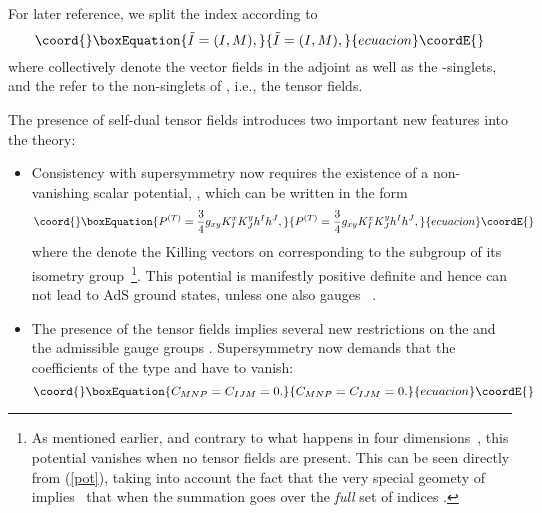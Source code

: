 \documentclass[a4paper,11pt]{article}
\providecommand{\ti}{\ensuremath{\tilde{I}}}
\providecommand{\tj}{\ensuremath{\tilde{J}}}
\providecommand{\tk}{\ensuremath{\tilde{K}}}
\providecommand{\M}{\ensuremath{\mathcal{M}}}
\begin{document}
For later reference, we split the index \myHighlight{$\ti$}\coordHE{} according to
\begin{equation}\coord{}\boxEquation{
\ti=(I,M),
}{
\ti=(I,M),
}{ecuacion}\coordE{}\end{equation}
where \coordHE{} collectively denote the
vector fields in the adjoint as well as the \coordHE{}-singlets, and the
\coordHE{} refer to the non-singlets of \coordHE{},
i.e., the tensor fields.

The presence of self-dual tensor fields introduces two important
new features into the theory:
\begin{itemize}

\item Consistency with supersymmetry now requires the existence
of a non-vanishing
scalar potential, \coordHE{}, which can be written in the form~\cite{GZ1}
\begin{equation}\coord{}\boxEquation{\label{pot}
P^{(T)}=\frac{3}{4}g_{xy}K^{x}_I K^{y}_J h^I h^J,
}{P^{(T)}=\frac{3}{4}g_{xy}K^{x}_I K^{y}_J h^I h^J,
}{ecuacion}\coordE{}\end{equation}
where the \coordHE{} denote the Killing vectors on \myHighlight{$\M_{VS}$}\coordHE{} corresponding to the subgroup 
\myHighlight{$K\subset G_{VS}\subset Iso(\M_{VS})$}\coordHE{} of its isometry group~\footnote{As mentioned 
earlier, and contrary to what happens in four dimensions~\cite{dWvP0,ABCDFF}, this 
potential vanishes when no tensor fields are present. This can be seen directly from 
(\ref{pot}), taking into account the fact that the very special geomety of \myHighlight{$\M_{VS}$}\coordHE{} 
implies~\cite{GST2} that \myHighlight{$ K^{x}_{\ti}  h^{\ti}=0$}\coordHE{} when the summation goes over the 
\emph{full} set of indices \myHighlight{$\ti$}\coordHE{}.}. This potential is manifestly positive definite and 
hence  can not lead to AdS ground states, unless one also gauges \coordHE{}~\cite{GZ2}.

\item The presence of the tensor fields
implies  several new restrictions on the \myHighlight{$C_{\ti\tj\tk}$}\coordHE{} and the
admissible gauge groups \coordHE{} \cite{GZ1}.
Supersymmetry now demands that the
coefficients of the type \coordHE{} and \coordHE{} have to vanish:
\begin{equation}\coord{}\boxEquation{\label{vanishingC}
C_{MNP}= C_{IJM}=0.
}{C_{MNP}= C_{IJM}=0.
}{ecuacion}\coordE{}\end{equation}


\end{itemize}
\end{document}

